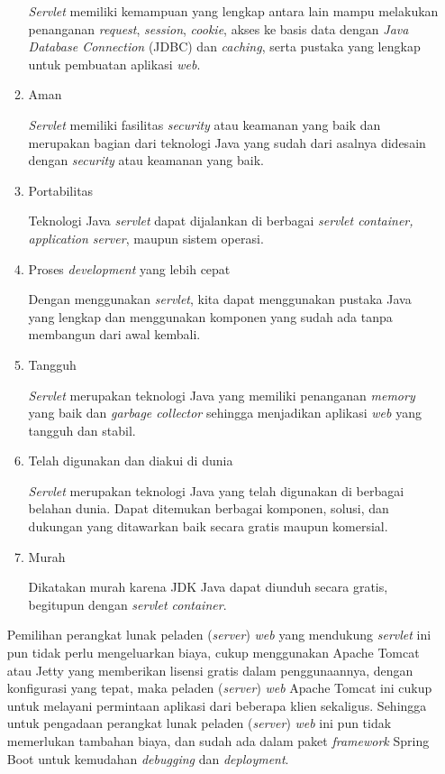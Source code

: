 \documentclass[pdftex,12pt, oneside]{article}
\begin{document}
\begin{enumerate}
\begin{enumerate}
\textit{Servlet} memiliki kemampuan yang lengkap antara lain mampu melakukan penanganan \textit{request}, \textit{session}, \textit{cookie}, akses ke basis data dengan \textit{Java Database Connection} (JDBC) dan \textit{caching}, serta pustaka yang lengkap untuk pembuatan aplikasi \textit{web}.
	
		\item Aman
		
\textit{Servlet} memiliki fasilitas \textit{security} atau keamanan yang baik dan merupakan bagian dari teknologi Java yang sudah dari asalnya didesain dengan \textit{security} atau keamanan yang baik.		
		
		\item Portabilitas
		
Teknologi Java \textit{servlet} dapat dijalankan di berbagai \textit{servlet container, application server}, maupun sistem operasi.		
		
		\item Proses \textit{development} yang lebih cepat
		
Dengan menggunakan \textit{servlet}, kita dapat menggunakan pustaka Java yang lengkap dan menggunakan komponen yang sudah ada tanpa membangun dari awal kembali.		
		
		\item Tangguh
		
\textit{Servlet} merupakan teknologi Java yang memiliki penanganan \textit{memory} yang baik dan \textit{garbage collector} sehingga menjadikan aplikasi \textit{web} yang tangguh dan stabil.		
		
		\item Telah digunakan dan diakui di dunia
		
\textit{Servlet} merupakan teknologi Java yang telah digunakan di berbagai belahan dunia. Dapat ditemukan berbagai komponen, solusi, dan dukungan yang ditawarkan baik secara gratis maupun komersial.		
		
		\item Murah
		
Dikatakan murah karena JDK Java dapat diunduh secara gratis, begitupun dengan \textit{servlet container}.		
		
	\end{enumerate}
	
Pemilihan perangkat lunak peladen (\textit{server}) \textit{web} yang mendukung \textit{servlet} ini pun tidak perlu mengeluarkan biaya, cukup menggunakan Apache Tomcat atau Jetty yang memberikan lisensi gratis dalam penggunaannya, dengan konfigurasi yang tepat, maka peladen (\textit{server}) \textit{web} Apache Tomcat ini cukup untuk melayani permintaan aplikasi dari beberapa klien sekaligus. Sehingga untuk pengadaan perangkat lunak peladen (\textit{server}) \textit{web} ini pun tidak memerlukan tambahan biaya, dan sudah ada dalam paket \textit{framework} Spring Boot untuk kemudahan \textit{debugging} dan \textit{deployment}.


\end{enumerate}
\end{document}
